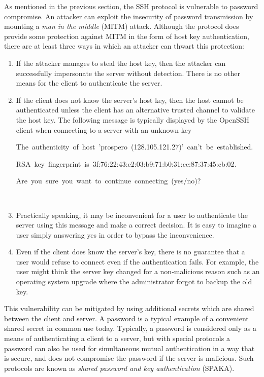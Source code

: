 As mentioned in the previous section, the SSH protocol is vulnerable
to password compromise. An attacker can exploit the insecurity of
password transmission by mounting a \emph{man in the middle} (MITM)
attack. Although the protocol does provide some protection against
MITM in the form of host key authentication, there are at least three
ways in which an attacker can thwart this protection:
\begin{enumerate}
\item If the attacker manages to steal the host key, then the attacker can
successfully impersonate the server without detection. There is no
other means for the client to authenticate the server.
\item If the client does not know the server's host key, then the host cannot
be authenticated unless the client has an alternative trusted channel
to validate the host key. The following message is typically displayed
by the OpenSSH client when connecting to a server with an unknown
key\\
%
\begin{minipage}[t]{1\columnwidth}%
\begin{lyxcode}


The~authenticity~of~host~'prospero~(128.105.121.27)'~can't~be~established.

RSA~key~fingerprint~is~3f:76:22:43:c2:03:b9:71:b0:31:ce:87:37:45:cb:02.~

Are~you~sure~you~want~to~continue~connecting~(yes/no)?
\end{lyxcode}
%
\end{minipage}\\

\item Practically speaking, it may be inconvenient for a user to authenticate
the server using this message and make a correct decision. It is easy
to imagine a user simply answering yes in order to bypass the inconvenience. 
\item Even if the client does know the server's key, there is no guarantee
that a user would refuse to connect even if the authentication fails.
For example, the user might think the server key changed for a non-malicious
reason such as an operating system upgrade where the administrator
forgot to backup the old key.
\end{enumerate}
This vulnerability can be mitigated by using additional secrets which
are shared between the client and server. A password is a typical
example of a convenient shared secret in common use today. Typically,
a password is considered only as a means of authenticating a client
to a server, but with special protocols a password can also be used
for simultaneous mutual authentication in a way that is secure, and
does not compromise the password if the server is malicious. Such
protocols are known as \emph{shared password and key authentication}
(SPAKA).


